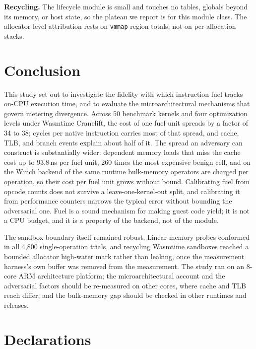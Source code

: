 \documentclass{ws-jcsc}
\begin{document}
\textbf{Recycling.} The lifecycle module is small and touches no tables, globals beyond its memory, or host state, so the plateau we report is for this module class. The allocator-level attribution rests on \texttt{vmmap} region totals, not on per-allocation stacks.

\section{Conclusion}
\label{sec:conclusion}
This study set out to investigate the fidelity with which instruction fuel tracks on-CPU execution time, and to evaluate the microarchitectural mechanisms that govern metering divergence. Across 50 benchmark kernels and four optimization levels under Wasmtime Cranelift, the cost of one fuel unit spreads by a factor of 34 to 38; cycles per native instruction carries most of that spread, and cache, TLB, and branch events explain about half of it. The spread an adversary can construct is substantially wider: dependent memory loads that miss the cache cost up to $93.8$\,ns per fuel unit, $260$ times the most expensive benign cell, and on the Winch backend of the same runtime bulk-memory operators are charged per operation, so their cost per fuel unit grows without bound. Calibrating fuel from opcode counts does not survive a leave-one-kernel-out split, and calibrating it from performance counters narrows the typical error without bounding the adversarial one. Fuel is a sound mechanism for making guest code yield; it is not a CPU budget, and it is a property of the backend, not of the module.

The sandbox boundary itself remained robust. Linear-memory probes conformed in all 4{,}800 single-operation trials, and recycling Wasmtime sandboxes reached a bounded allocator high-water mark rather than leaking, once the measurement harness's own buffer was removed from the measurement. The study ran on an 8-core ARM architecture platform; the microarchitectural account and the adversarial factors should be re-measured on other cores, where cache and TLB reach differ, and the bulk-memory gap should be checked in other runtimes and releases.

\clearpage

\section*{Declarations}
\end{document}
